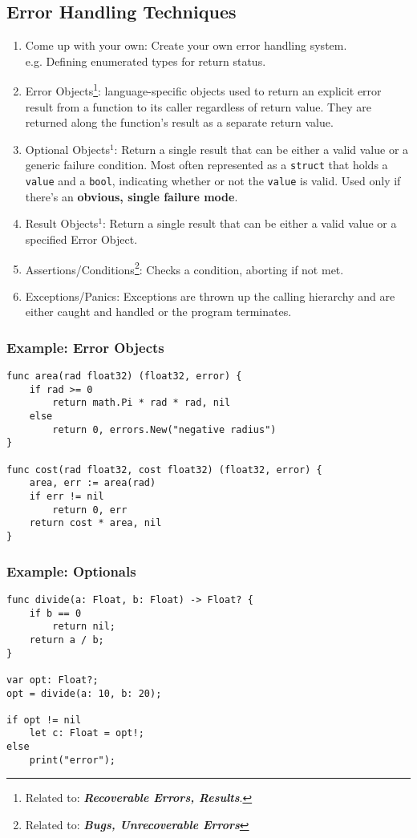 \documentclass{article}
\begin{document}
\subsection{Error Handling Techniques}
\begin{enumerate}[label=(\roman*)]
\item Come up with your own: Create your own error handling system. \\
  e.g. Defining enumerated types for return status.
\item Error Objects\footnote{Related to:
    \textit{\textbf{Recoverable Errors, Results}}.}: language-specific
  objects used to return an explicit error result from a function to its
  caller regardless of return value. They are returned along the
  function's result as a separate return value. 
\item Optional Objects$^1$: Return a single
  result that can be either a valid value or a generic failure
  condition. Most often represented as a \texttt{struct} that holds a
  \texttt{value} and a \texttt{bool}, indicating whether or not the
  \texttt{value} is valid. Used only if there's an \textbf{obvious, single
  failure mode}.
\item Result Objects$^1$: Return a single result that can be either a
  valid value or a specified Error Object.
\item Assertions/Conditions\footnote{Related to: \textit{\textbf{Bugs,
        Unrecoverable Errors}}}: Checks a condition, aborting if not met.
\item Exceptions/Panics: Exceptions are thrown up the calling
  hierarchy and are either caught and handled or the program terminates.
\end{enumerate}

\subsubsection*{Example: Error Objects}
\begin{verbatim}
func area(rad float32) (float32, error) {
    if rad >= 0
        return math.Pi * rad * rad, nil
    else
        return 0, errors.New("negative radius")
}

func cost(rad float32, cost float32) (float32, error) {
    area, err := area(rad)
    if err != nil
        return 0, err
    return cost * area, nil
}
\end{verbatim}

\subsubsection*{Example: Optionals}
\begin{verbatim}
func divide(a: Float, b: Float) -> Float? {
    if b == 0
        return nil;
    return a / b;
}

var opt: Float?;
opt = divide(a: 10, b: 20);

if opt != nil
    let c: Float = opt!;
else
    print("error");
\end{verbatim}
\end{document}
